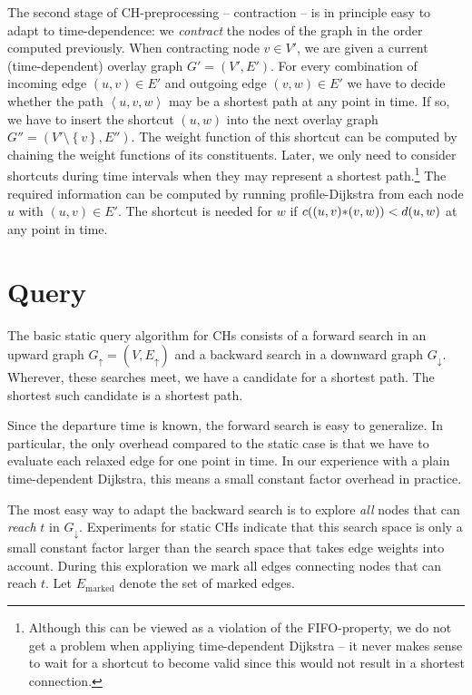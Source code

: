 \documentclass[12pt]{article}
\newcommand{\seq}[1]{\left\langle #1\right\rangle}
\newcommand{\set}[1]{\left\{ #1\right\}}
\newcommand{\Gup}{G_{\uparrow}}
\newcommand{\Gdown}{G_{\downarrow}}
\newcommand{\Eup}{E_{\uparrow}}
\newcommand{\Emarked}{E_{\mathrm{marked}}}
\begin{document}
The second stage of CH-preprocessing -- contraction -- is in principle
easy to adapt to time-dependence: we \emph{contract} the nodes of the
graph in the order computed previously. When contracting node $v\in
V'$, we are given a current (time-dependent) overlay graph
$G'=(V',E')$. For every combination of incoming edge $(u,v)\in E'$ and
outgoing edge $(v,w)\in E'$ we have to decide whether the path
$\seq{u,v,w}$ may be a shortest path at any point in time.  If so, we
have to insert the shortcut $(u,w)$ into the next overlay graph
$G''=(V'\setminus\set{v}, E'')$. The weight function of this shortcut can be computed
by chaining the weight functions of its constituents.
Later, we only need to consider shortcuts during time intervals when they
may represent a shortest path.\footnote{Although this can be viewed as a violation of
the FIFO-property, we do not get a problem when appliying time-dependent Dijkstra --
it never makes sense to wait for a shortcut to become valid since
this would not result in a shortest connection.}
The
required information can be computed by running profile-Dijkstra from
each node $u$ with $(u,v)\in E'$. The shortcut is needed for $w$ if
$c((u,v)\mathbf{*} (v,w))<d(u,w)$ at any point in time.


\section{Query}\label{s:query}

The basic static query algorithm for CHs consists of a forward search in
an upward graph $\Gup=(V,\Eup)$ and a backward search in a downward graph $\Gdown$.
Wherever, these searches meet, we have a candidate for a shortest path.
The shortest such candidate is a shortest path.

Since the departure time is known, the forward search is easy to
generalize. In particular, the only overhead compared to the static case
is that we have to evaluate each relaxed edge for one point in time.
In our experience with a plain time-dependent Dijkstra, this means
a small constant factor overhead in practice.

The most easy way to adapt the backward search is to explore
\emph{all} nodes that can \emph{reach} $t$ in $\Gdown$.
Experiments for static CHs \cite{Gei08} indicate that
this search space is only a small constant factor larger than
the search space that takes edge weights into account.
During this exploration we mark all edges connecting nodes that
can reach $t$. Let $\Emarked$ denote the set of marked edges.
\end{document}
